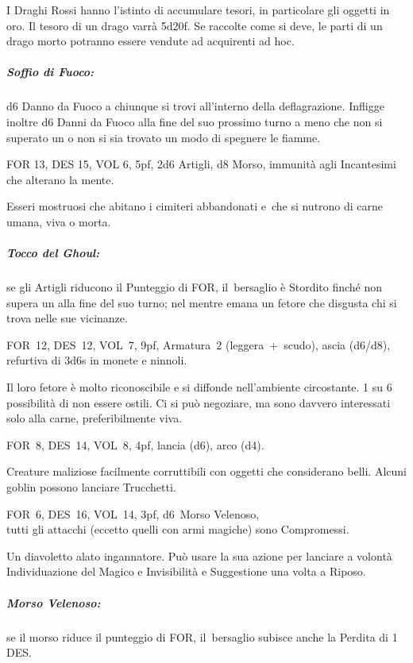 \documentclass[itdr]{subfiles}
\begin{document}
I Draghi Rossi hanno l'istinto di accumulare tesori, in particolare gli oggetti in oro. Il tesoro di un drago varrà 5d20f. Se raccolte come si deve, le parti di un drago morto potranno essere vendute ad acquirenti ad hoc.

\subparagraph{Soffio di Fuoco:} d6 Danno da Fuoco a chiunque si trovi all'interno della deflagrazione. Infligge inoltre d6 Danni da Fuoco alla fine del suo prossimo turno a meno che non si superato un  o non si sia trovato un modo di spegnere le fiamme.

\break

FOR 13, DES 15, VOL 6, 5pf, 2d6 Artigli, d8 Morso, \mbox{immunità} agli Incantesimi che alterano la mente.

Esseri mostruosi che abitano i cimiteri abbandonati e~che si nutrono di carne umana, viva o morta.

\subparagraph{Tocco del Ghoul:} se gli Artigli riducono il Punteggio di FOR, \mbox{il bersaglio} è Stordito finché non supera un  alla fine del suo turno; nel mentre emana un fetore che disgusta chi si trova nelle sue vicinanze.

\vfill

FOR~12, DES~12, VOL~7, 9pf, Armatura~2 \mbox{(leggera + scudo),} ascia (d6/d8), refurtiva di 3d6s in monete e ninnoli.

Il loro fetore è molto riconoscibile e si diffonde nell'ambiente circostante.
1 su 6 possibilità di non essere ostili. Ci si può negoziare, ma sono davvero interessati solo alla carne, preferibilmente viva.

\vfill

FOR~8, DES~14, VOL~8, 4pf, lancia (d6), arco (d4).

Creature maliziose facilmente corruttibili con oggetti che considerano belli. Alcuni goblin possono lanciare Trucchetti.

\vfill

FOR~6, DES~16, VOL~14, 3pf, d6~Morso Velenoso,\\tutti gli attacchi (eccetto quelli con armi magiche) sono Compromessi.

Un diavoletto alato ingannatore. Può usare la sua azione per lanciare a volontà Individuazione del Magico e Invisibilità e Suggestione una volta a Riposo.

\subparagraph{Morso Velenoso:} se il morso riduce il punteggio di FOR, \mbox{il bersaglio} subisce anche la Perdita di 1 DES.
\end{document}
